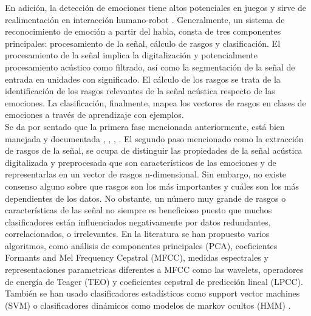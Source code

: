 \documentclass[11pt,lettersize]{article} %
\begin{document}
En adición, la detección de emociones tiene altos potenciales en juegos \cite{Jones2008} y sirve de realimentación en interacción humano-robot \cite{Jones2008a}. Generalmente, un sistema de reconocimiento de emoción a partir del habla, consta de tres componentes principales: procesamiento de la señal, cálculo de rasgos y clasificación. 
El procesamiento de la señal implica la digitalización y potencialmente procesamiento acústico como filtrado, así como la segmentación de la señal de entrada en unidades con significado. El cálculo de los rasgos se trata de la identificación de los rasgos relevantes de la señal acústica respecto de las emociones. La clasificación, finalmente, mapea los vectores de rasgos en clases de emociones a través de aprendizaje con ejemplos. \\

Se da por sentado que la primera fase mencionada anteriormente, está bien manejada y documentada \cite{Devillers2005}, \cite{Batliner2003}, \cite{Fernandez2005}, \cite{Nicholas2006}. El segundo paso mencionado como la extracción de rasgos de la señal, se ocupa de distinguir las propiedades de la señal acústica digitalizada y preprocesada que son característicos de las emociones y de representarlas en un vector de rasgos n-dimensional. Sin embargo, no existe consenso alguno sobre que rasgos son los más importantes y cuáles son los más dependientes de los datos. No obstante, un número muy grande de rasgos o características de las señal no siempre es beneficioso puesto que muchos clasificadores están influenciados negativamente por datos redundantes, correlacionados, o irrelevantes. En la literatura se han propuesto varios algoritmos, como análisis de componentes principales (PCA), coeficientes Formants and Mel Frequency Cepstral (MFCC), medidas espectrales y representaciones parametricas diferentes a MFCC como las wavelets, operadores de energía de Teager (TEO) y coeficientes cepstral de predicción lineal (LPCC). También se han usado clasificadores estadísticos como support vector machines (SVM) o clasificadores dinámicos como modelos de markov ocultos (HMM) \cite{Vogt2008}.\\
\end{document}
